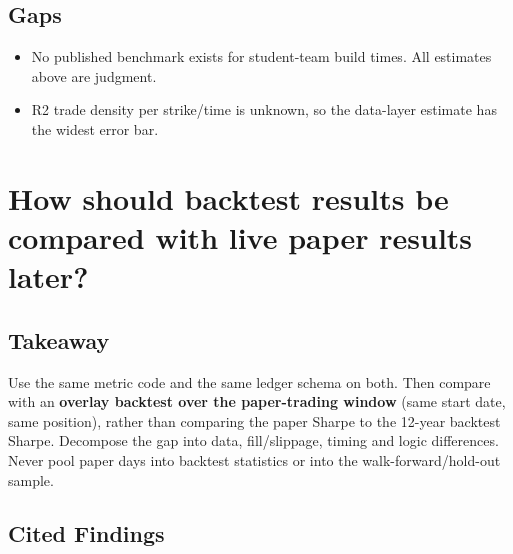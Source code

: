 \documentclass{article}
\begin{document}
\subsection{Gaps}

\begin{itemize}

\item No published benchmark exists for student-team build times. All estimates above are judgment.

\item R2 trade density per strike/\allowbreak{}time is unknown, so the data-layer estimate has the widest error bar.

\end{itemize}

\section{How should backtest results be compared with live paper results later?}

\subsection{Takeaway}

Use the same metric code and the same ledger schema on both. Then compare with an \textbf{overlay backtest over the paper-trading window} (same start date, same position), rather than comparing the paper Sharpe to the 12-year backtest Sharpe. Decompose the gap into data, fill/\allowbreak{}slippage, timing and logic differences. Never pool paper days into backtest statistics or into the walk-forward/\allowbreak{}hold-out sample.

\subsection{Cited Findings}
\end{document}
